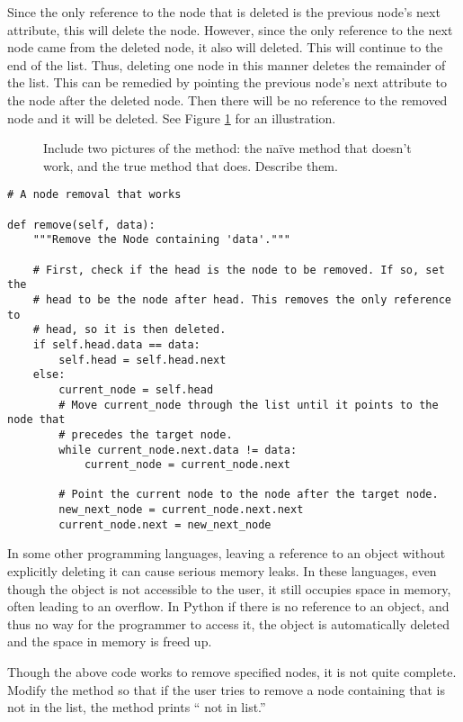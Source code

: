Since the only reference to the node that is deleted is the previous node's next attribute, this will delete the node.
However, since the only reference to the next node came from the deleted node, it also will deleted.
This will continue to the end of the list.
Thus, deleting one node in this manner deletes the remainder of the list.
This can be remedied by pointing the previous node's next attribute to the node after the deleted node.
Then there will be no reference to the removed node and it will be deleted. 
See Figure \ref{fig:remove} for an illustration.

\begin{figure}
\centering
\caption{Include two pictures of the  method: the na{\"i}ve method that doesn't work, and the true method that does. Describe them.}
\label{fig:remove}
\end{figure}


\begin{lstlisting}
# A node removal that works

def remove(self, data):
	"""Remove the Node containing 'data'."""

	# First, check if the head is the node to be removed. If so, set the
	# head to be the node after head. This removes the only reference to
	# head, so it is then deleted.
	if self.head.data == data:
		self.head = self.head.next
	else:
		current_node = self.head
		# Move current_node through the list until it points to the node that
		# precedes the target node.
		while current_node.next.data != data:
			current_node = current_node.next
	
		# Point the current node to the node after the target node.
		new_next_node = current_node.next.next
		current_node.next = new_next_node
\end{lstlisting}

\begin{warn}
In some other programming languages, leaving a reference to an object without explicitly deleting it can cause serious memory leaks.
In these languages, even though the object is not accessible to the user, it still occupies space in memory, often leading to an overflow.
In Python if there is no reference to an object, and thus no way for the programmer to access it, the object is automatically deleted and the space in memory is freed up.
\end{warn}

\begin{problem}
Though the above code works to remove specified nodes, it is not quite complete.
Modify the  method so that if the user tries to remove a node containing  that is not in the list, the method prints `` not in list.''
\end{problem}

